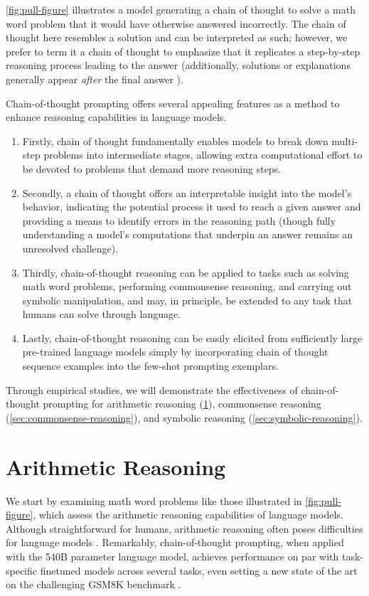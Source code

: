 \cref{fig:pull-figure} illustrates a model generating a chain of thought to solve a math word problem that it would have otherwise answered incorrectly. The chain of thought here resembles a solution and can be interpreted as such; however, we prefer to term it a chain of thought to emphasize that it replicates a step-by-step reasoning process leading to the answer (additionally, solutions or explanations generally appear \textit{after} the final answer \citep[][\textit{inter alia}]{narang2020wt5,wiegreffe2021reframing,lampinen2022can}).

Chain-of-thought prompting offers several appealing features as a method to enhance reasoning capabilities in language models.

\begin{enumerate}[topsep=1pt,itemsep=0ex]
    \item Firstly, chain of thought fundamentally enables models to break down multi-step problems into intermediate stages, allowing extra computational effort to be devoted to problems that demand more reasoning steps.
    \item Secondly, a chain of thought offers an interpretable insight into the model's behavior, indicating the potential process it used to reach a given answer and providing a means to identify errors in the reasoning path (though fully understanding a model's computations that underpin an answer remains an unresolved challenge).
    \item Thirdly, chain-of-thought reasoning can be applied to tasks such as solving math word problems, performing commonsense reasoning, and carrying out symbolic manipulation, and may, in principle, be extended to any task that humans can solve through language.
    \item Lastly, chain-of-thought reasoning can be easily elicited from sufficiently large pre-trained language models simply by incorporating chain of thought sequence examples into the few-shot prompting exemplars.
\end{enumerate}

Through empirical studies, we will demonstrate the effectiveness of chain-of-thought prompting for arithmetic reasoning (\cref{sec:arithmetic-reasoning}), commonsense reasoning (\cref{sec:commonsense-reasoning}), and symbolic reasoning (\cref{sec:symbolic-reasoning}).

\section{Arithmetic Reasoning}\label{sec:arithmetic-reasoning}
We start by examining math word problems like those illustrated in \cref{fig:pull-figure}, which assess the arithmetic reasoning capabilities of language models. Although straightforward for humans, arithmetic reasoning often poses difficulties for language models \citep[][\textit{inter alia}]{hendrycks2021measuring,patel-etal-2021-nlp}. Remarkably, chain-of-thought prompting, when applied with the 540B parameter language model, achieves performance on par with task-specific finetuned models across several tasks, even setting a new state of the art on the challenging GSM8K benchmark \citep{cobbe2021training}.

